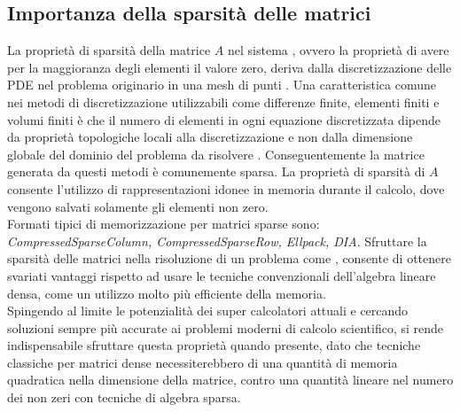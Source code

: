 \subsection{Importanza della sparsità delle matrici}
La proprietà di sparsità della matrice $A$  nel sistema , ovvero la proprietà di avere per la maggioranza degli elementi il valore zero,
deriva dalla discretizzazione delle PDE nel problema originario in una mesh di punti \cite{sparseLinearSolverTR}.
Una caratteristica comune nei metodi di discretizzazione utilizzabili come differenze finite, elementi finiti e volumi finiti 
è che il numero di elementi in ogni equazione discretizzata dipende da proprietà topologiche locali alla discretizzazione
e non dalla dimensione globale del dominio del problema da risolvere { \bf \cite{spMVfanf,pdeSparsfd1,pdeSparsfd2,pdeSparsfd3}}.
Conseguentemente la matrice generata da questi metodi è comunemente sparsa.\voidLine
La proprietà di sparsità di $A$ consente l'utilizzo di rappresentazioni idonee in memoria durante il calcolo, 
dove vengono salvati solamente gli elementi non zero.\\
Formati tipici di memorizzazione per matrici sparse sono: \emph{CompressedSparseColumn, CompressedSparseRow, Ellpack, DIA}.%
\voidLine	%
Sfruttare la sparsità delle matrici nella risoluzione di un problema come , consente di ottenere svariati vantaggi
rispetto ad usare le tecniche convenzionali dell'algebra lineare densa, come un utilizzo molto più efficiente della memoria.\\
Spingendo al limite le potenzialità dei super calcolatori attuali e cercando soluzioni sempre più accurate ai problemi moderni di calcolo scientifico,
si rende indispensabile sfruttare questa proprietà quando presente,
dato che tecniche classiche per matrici dense necessiterebbero di una quantità di memoria 
quadratica nella dimensione della matrice, contro una quantità lineare nel numero dei non zeri con tecniche di algebra sparsa.
\voidLine	%
